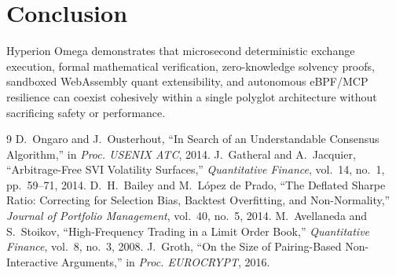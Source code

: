 \documentclass[10pt,twocolumn]{article}
\begin{document}
\section{Conclusion}
Hyperion Omega demonstrates that microsecond deterministic exchange execution, formal mathematical verification, zero-knowledge solvency proofs, sandboxed WebAssembly quant extensibility, and autonomous eBPF/MCP resilience can coexist cohesively within a single polyglot architecture without sacrificing safety or performance.

\begin{thebibliography}{9}
 D.~Ongaro and J.~Ousterhout, ``In Search of an Understandable Consensus Algorithm,'' in \emph{Proc. USENIX ATC}, 2014.
 J.~Gatheral and A.~Jacquier, ``Arbitrage-Free SVI Volatility Surfaces,'' \emph{Quantitative Finance}, vol.~14, no.~1, pp.~59--71, 2014.
 D.~H.~Bailey and M.~L\'opez de Prado, ``The Deflated Sharpe Ratio: Correcting for Selection Bias, Backtest Overfitting, and Non-Normality,'' \emph{Journal of Portfolio Management}, vol.~40, no.~5, 2014.
 M.~Avellaneda and S.~Stoikov, ``High-Frequency Trading in a Limit Order Book,'' \emph{Quantitative Finance}, vol.~8, no.~3, 2008.
 J.~Groth, ``On the Size of Pairing-Based Non-Interactive Arguments,'' in \emph{Proc. EUROCRYPT}, 2016.
\end{thebibliography}
\end{document}
